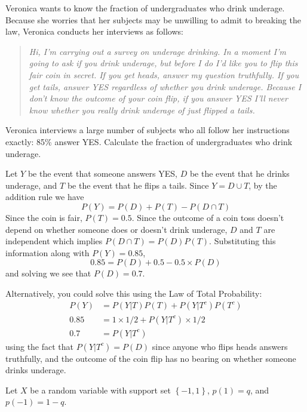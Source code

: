 \documentclass[addpoints,12pt]{exam}
\begin{document}
\begin{questions}
\question[20] Veronica wants to know the fraction of undergraduates who drink underage.
Because she worries that her subjects may be unwilling to admit to breaking the law, Veronica conducts her interviews as follows:
\begin{quote}
  \emph{Hi, I'm carrying out a survey on underage drinking.
  In a moment I'm going to ask if you drink underage, but before I do I'd like you to flip this fair coin in secret.
If you get heads, answer my question truthfully.
If you get tails, answer YES regardless of whether you drink underage.
Because I don't know the outcome of your coin flip, if you answer YES I'll never know whether you really drink underage of just flipped a tails.}
\end{quote}
Veronica interviews a large number of subjects who all follow her instructions exactly: 85\% answer YES.
Calculate the fraction of undergraduates who drink underage.
\begin{solution}[2.25in]
  Let $Y$ be the event that someone answers YES, $D$ be the event that he drinks underage, and $T$ be the event that he flips a tails.
  Since $Y = D \cup T$, by the addition rule we have
  \[P(Y) = P(D) + P(T) - P(D\cap T)\]
  Since the coin is fair, $P(T) = 0.5$.
  Since the outcome of a coin toss doesn't depend on whether someone does or doesn't drink underage, $D$ and $T$ are independent which implies $P(D\cap T) = P(D)P(T)$.
  Substituting this information along with $P(Y) = 0.85$,
  \[0.85 = P(D) + 0.5 - 0.5 \times P(D) \]
 and solving we see that $P(D) = 0.7$.

 Alternatively, you could solve this using the Law of Total Probability:
 \begin{align*}
   P(Y) &= P(Y|T)P(T) + P(Y|T^c)P(T^c) \\
   0.85 &= 1 \times 1/2 + P(Y|T^c)\times 1/2\\
   0.7 &= P(Y|T^c) 
 \end{align*}
 using the fact that $P(Y|T^c) = P(D)$ since anyone who flips heads answers truthfully, and the outcome of the coin flip has no bearing on whether someone drinks underage.
\end{solution}

\newpage

\question Let $X$ be a random variable with support set $\left\{ -1, 1 \right\}$, $p(1) = q$, and $p(-1) = 1-q$.
\end{questions}
\end{document}

